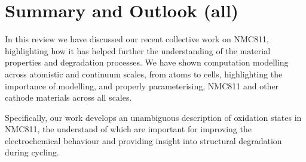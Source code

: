 \documentclass[journal=jacsat,manuscript=article]{achemso}
\begin{document}
\section{Summary and Outlook (all)}

In this review we have discussed our recent collective work on NMC811, highlighting how it has helped further the understanding of the material properties and degradation processes. We have shown computation modelling across atomistic and continuum scales, from atoms to cells, highlighting the importance of modelling, and properly parameterising, NMC811 and other cathode materials across all scales.

Specifically, our work develops an unambiguous description of oxidation states in NMC811, the understand of which are important for improving the electrochemical behaviour and providing insight into structural degradation during cycling.
\end{document}
